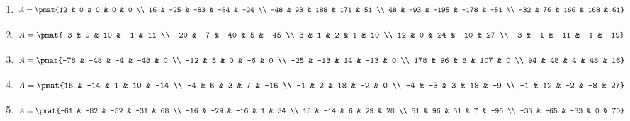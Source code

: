 \begin{enumerate}
\item

\begin{align*}
A = \pmat{12 & 0 & 0 & 0 & 0 \\ 16 & -25 & -83 & -84 & -24 \\ -48 & 93 & 188 & 171 & 51 \\ 48 & -93 & -195 & -178 & -51 \\ -32 & 76 & 166 & 168 & 61}
\end{align*}

\item

\begin{align*}
A = \pmat{-3 & 0 & 10 & -1 & 11 \\ -20 & -7 & -40 & 5 & -45 \\ 3 & 1 & 2 & 1 & 10 \\ 12 & 0 & 24 & -10 & 27 \\ -3 & -1 & -11 & -1 & -19}
\end{align*}

\item

\begin{align*}
A = \pmat{-78 & -48 & -4 & -48 & 0 \\ -12 & 5 & 0 & -6 & 0 \\ -25 & -13 & 14 & -13 & 0 \\ 178 & 96 & 8 & 107 & 0 \\ 94 & 48 & 4 & 48 & 16}
\end{align*}

\item

\begin{align*}
A = \pmat{16 & -14 & 1 & 10 & -14 \\ -4 & 6 & 3 & 7 & -16 \\ -1 & 2 & 18 & -2 & 0 \\ -4 & -3 & 3 & 18 & -9 \\ -1 & 12 & -2 & -8 & 27}
\end{align*}

\item

\begin{align*}
A = \pmat{-61 & -82 & -52 & -31 & 68 \\ -16 & -29 & -16 & 1 & 34 \\ 15 & -14 & 6 & 29 & 28 \\ 51 & 96 & 51 & 7 & -96 \\ -33 & -65 & -33 & 0 & 70}
\end{align*}


\end{enumerate}
